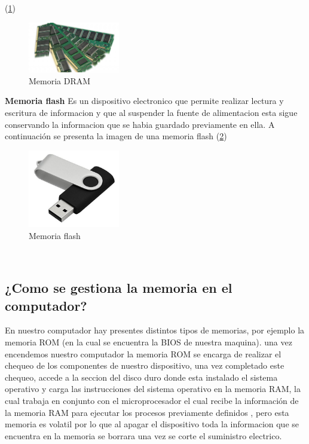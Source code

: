 \documentclass{article}
\begin{document}
(\ref{fig:memoria-DRAM})
\begin{figure}[h]
\includegraphics[width=4cm]{dram.jpg}\centering
\caption{Memoria DRAM}
\label{fig:memoria-DRAM}
\end{figure}
\newline
\newline
\textbf{Memoria flash}
Es un dispositivo electronico que permite realizar lectura y escritura de informacion y que al suspender la fuente de alimentacion esta sigue conservando la informacion que se habia guardado previamente en ella.
\newline
\newline
A continuación se presenta la imagen de una memoria flash
(\ref{fig:memoria-flash})
\begin{figure}[h]
\includegraphics[width=4cm]{memoria-flash.jpg}\centering
\caption{Memoria flash}
\label{fig:memoria-flash}
\end{figure}
\newline
\newline
\

\subsection{¿Como se gestiona la memoria en el computador?}
\newline
En nuestro computador hay presentes distintos tipos de memorias, por ejemplo la memoria ROM (en la cual se encuentra la BIOS de nuestra maquina). una vez encendemos nuestro computador la memoria ROM se encarga de realizar el chequeo de los componentes de nuestro dispositivo, una vez completado este chequeo, accede a la seccion del disco duro donde esta instalado el sistema operativo y carga las instrucciones del sistema operativo en la memoria RAM, la cual  trabaja en conjunto con el microprocesador el cual recibe la información de la memoria RAM para ejecutar los procesos previamente definidos , pero esta memoria es volatil por lo que al apagar el dispositivo toda la informacion que se encuentra en la memoria se borrara una vez se corte el suministro electrico.\cite{Gestion}
\newline
\end{document}
